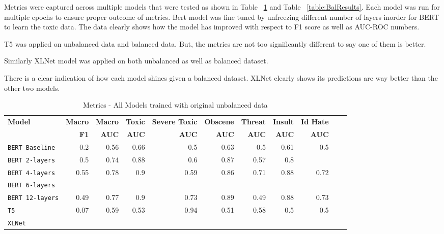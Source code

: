 \documentclass[11pt,a4paper]{article}
\begin{document}
Metrics were captured across multiple models that were tested as shown in Table ~\ref{table:UnBalResults} and Table ~\ref{table:BalResults}. Each model was run for multiple epochs to ensure proper outcome of metrics. Bert model was fine tuned by unfreezing different number of layers inorder for BERT to learn the toxic data. The data clearly shows how the model has improved with respect to F1 score as well as AUC-ROC numbers.

T5 was applied on unbalanced data and balanced data. But, the metrics are not too significantly different to say one of them is better.

Similarly XLNet model was applied on both unbalanced as well as balanced dataset.

There is a clear indication of how each model shines given a balanced dataset. XLNet clearly shows its predictions are way better than the other two models.

\begin{table}
\centering
\begin{tabular}{lrrrrrrrrrr}
\hline
\textbf{Model} & \textbf{Macro} & \textbf{Macro} & \textbf{Toxic} & \textbf{Severe Toxic} & \textbf{Obscene} & \textbf{Threat} & \textbf{Insult} & \textbf{Id Hate}
\\
\textbf{ } & \textbf{F1} & \textbf{AUC} & \textbf{AUC} & \textbf{AUC} & \textbf{AUC} & \textbf{AUC} & \textbf{AUC} & \textbf{AUC}\\
\hline
\verb|BERT Baseline|&0.2&0.56& 0.66 & 0.5 & 0.63 & 0.5 & 0.61 & 0.5 \\
\verb|BERT 2-layers| & 0.5 & 0.74 & 0.88 & 0.6 & 0.87 & 0.57 & 0.8 \\
\verb|BERT 4-layers| & 0.55 & 0.78 & 0.9 & 0.59 & 0.86 & 0.71 & 0.88 & 0.72 \\
\verb|BERT 6-layers| & & & & & & & & \\
\verb|BERT 12-layers| & 0.49 & 0.77 & 0.9 & 0.73 & 0.89 & 0.49 & 0.88 & 0.73 \\
\verb|T5| & 0.07 & 0.59 & 0.53 & 0.94 & 0.51 & 0.58 & 0.5 & 0.5 \\
\verb|XLNet| & & & & & & & & \\
\hline
\end{tabular}
\caption{Metrics - All Models trained with original unbalanced data}
\label{table:UnBalResults}
\end{table}
\end{document}
